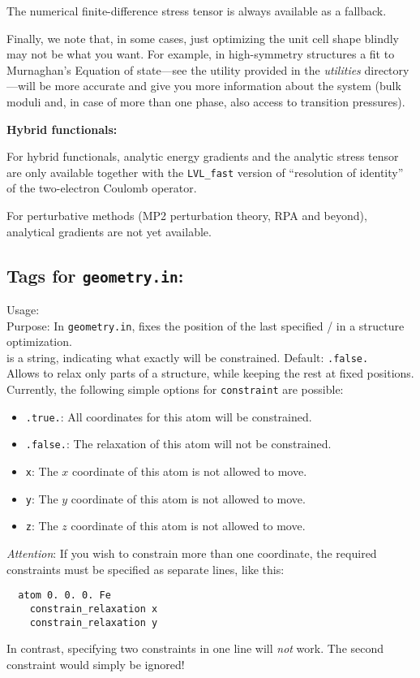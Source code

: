The numerical finite-difference stress tensor is always available as a
fallback.

Finally, we note that, in some cases, just optimizing the unit
cell shape blindly may not be what you want. For example, in
high-symmetry structures a fit to Murnaghan's Equation of state---see
the utility provided in the \emph{utilities} directory---will be more
accurate and give you more information about the system (bulk moduli
and, in case of more than one phase, also access to transition pressures).

\textbf{Hybrid functionals:}

For hybrid functionals, analytic energy gradients and the analytic stress 
tensor are only available together with the  
\texttt{LVL\_fast} version of ``resolution of identity'' of the two-electron 
Coulomb operator.\cite{Ihrig2015}

For perturbative methods (MP2 perturbation theory, RPA and beyond),
analytical gradients are not yet available. 


\subsection*{Tags for \texttt{geometry.in}:}

{
  \noindent 
  Usage:   \\[1.0ex]
  Purpose: In \texttt{geometry.in}, fixes the position of the last
    specified / in a structure optimization. \\[1.0ex]
   is a string, indicating what exactly will be
    constrained. Default: \texttt{.false.} \\
}
Allows to relax only parts of a structure, while keeping the rest at
fixed positions. Currently, the following simple options for
  \texttt{constraint} are possible:  
\begin{itemize}
  \item \texttt{.true.}: All coordinates for this atom will be constrained. 
  \item \texttt{.false.}: The relaxation of this atom will not be constrained.
  \item \texttt{x}: The $x$ coordinate of this atom is not allowed to move.
  \item \texttt{y}: The $y$ coordinate of this atom is not allowed to move.
  \item \texttt{z}: The $z$ coordinate of this atom is not allowed to move.
\end{itemize}
\emph{Attention}: If you wish to constrain more than one coordinate, the required
constraints must be specified as separate lines, like this:
\begin{verbatim}
  atom 0. 0. 0. Fe
    constrain_relaxation x
    constrain_relaxation y
\end{verbatim}
In contrast, specifying two constraints in one line will \emph{not} work. The
second constraint would simply be ignored!

